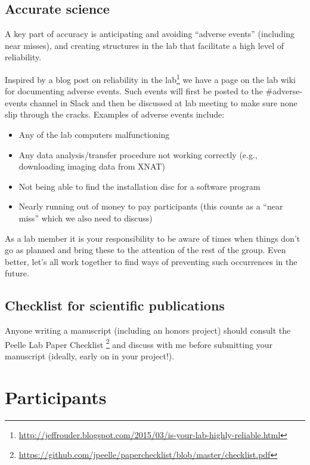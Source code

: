 \documentclass[letterpaper,12pt,oneside]{memoir}
\begin{document}
\subsection{Accurate science}

A key part of accuracy is anticipating and avoiding ``adverse events'' (including near misses), and creating structures in the lab that facilitate a high level of reliability.

Inspired by a blog post on reliability in the lab\footnote{\url{http://jeffrouder.blogspot.com/2015/03/is-your-lab-highly-reliable.html}} we have a page on the lab wiki for documenting adverse events. Such events will first be posted to the \#adverse-events channel in Slack and then be discussed at lab meeting to make sure none slip through the cracks. Examples of adverse events include:

\begin{itemize}
\item Any of the lab computers malfunctioning
\item Any data analysis/transfer procedure not working correctly (e.g., downloading imaging data from XNAT)
\item Not being able to find the installation disc for a software program
\item Nearly running out of money to pay participants (this counts as a ``near miss'' which we also need to discuss)
\end{itemize}

As a lab member it is your responsibility to be aware of times when things don't go as planned and bring these to the attention of the rest of the group. Even better, let's all work together to find ways of preventing such occurrences in the future.


\subsection{Checklist for scientific publications}

Anyone writing a manuscript (including an honors project) should consult the Peelle Lab Paper Checklist \footnote{\url{https://github.com/jpeelle/paperchecklist/blob/master/checklist.pdf}} and discuss with me before submitting your manuscript (ideally, early on in your project!).


\section{Participants}
\label{sec:participants}
\end{document}
